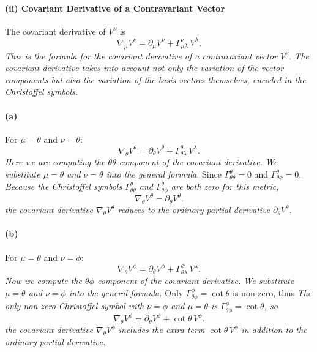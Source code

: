\documentclass{article}
\begin{document}
\paragraph*{(ii) Covariant Derivative of a Contravariant Vector}
The covariant derivative of \(V^\nu\) is
\[
\nabla_\mu V^\nu
=
\partial_\mu V^\nu + \Gamma^\nu_{\mu\lambda}\,V^\lambda.
\]
\emph{This is the formula for the covariant derivative of a contravariant vector \(V^\nu\). The covariant derivative takes into account not only the variation of the vector components but also the variation of the basis vectors themselves, encoded in the Christoffel symbols.}

\paragraph{(a)} For \(\mu = \theta\) and \(\nu = \theta\):
\[
\nabla_{\theta} V^\theta
=
\partial_\theta V^\theta
+
\Gamma^\theta_{\theta \lambda}\, V^\lambda.
\]
\emph{Here we are computing the \(\theta\theta\) component of the covariant derivative. We substitute \(\mu = \theta\) and \(\nu = \theta\) into the general formula.}
Since \(\Gamma^\theta_{\theta\theta} = 0\) and \(\Gamma^\theta_{\theta\phi} = 0\),
\emph{Because the Christoffel symbols \(\Gamma^\theta_{\theta\theta}\) and \(\Gamma^\theta_{\theta\phi}\) are both zero for this metric,}
\[
\nabla_{\theta} V^\theta
=
\partial_\theta V^\theta.
\]
\emph{the covariant derivative \(\nabla_{\theta} V^\theta\) reduces to the ordinary partial derivative \(\partial_\theta V^\theta\).}

\paragraph{(b)} For \(\mu = \theta\) and \(\nu = \phi\):
\[
\nabla_{\theta} V^\phi
=
\partial_\theta V^\phi
+
\Gamma^\phi_{\theta\lambda}\,V^\lambda.
\]
\emph{Now we compute the \(\theta\phi\) component of the covariant derivative. We substitute \(\mu = \theta\) and \(\nu = \phi\) into the general formula.}
Only \(\Gamma^\phi_{\theta\phi} = \cot\theta\) is non-zero, thus
\emph{The only non-zero Christoffel symbol with \(\nu = \phi\) and \(\mu = \theta\) is \(\Gamma^\phi_{\theta\phi} = \cot\theta\), so}
\[
\nabla_{\theta} V^\phi
=
\partial_\theta V^\phi + \cot\theta \, V^\phi.
\]
\emph{the covariant derivative \(\nabla_{\theta} V^\phi\) includes the extra term \(\cot\theta \, V^\phi\) in addition to the ordinary partial derivative.}
\end{document}
